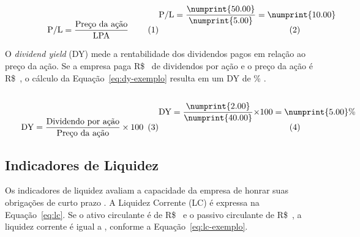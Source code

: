 \documentclass[recuosum=1.5cm]{iftex2024}
\begin{document}
\bigskip
\begin{subequations} \noindent
\begin{minipage}[b]{0.48\linewidth}
    \begin{equation} \label{eq:pl}
        \text{P/L} = \frac{\text{Preço da ação}}{\text{LPA}}
    \end{equation}
\end{minipage}
\hfill
\begin{minipage}[b]{0.48\linewidth}
    \begin{equation} \label{eq:pl-exemplo}
        \text{P/L} = \frac{\numprint{50.00}}{\numprint{5.00}} = \numprint{10.00}
    \end{equation}
\end{minipage}
\end{subequations}
\bigskip

O \textit{dividend yield} (DY) mede a rentabilidade dos dividendos pagos em relação ao preço da ação. Se a empresa paga R\$~ de dividendos por ação e o preço da ação é R\$~, o cálculo da Equação~\eqref{eq:dy-exemplo} resulta em um DY de \% \cite{kearney:2014:textual}.

\bigskip
\begin{subequations} \noindent
\begin{minipage}[b]{0.48\linewidth}
    \begin{equation} \label{eq:dy}
        \text{DY} = \frac{\text{Dividendo por ação}}{\text{Preço da ação}} \times 100
    \end{equation}
\end{minipage}
\hfill
\begin{minipage}[b]{0.48\linewidth}
    \begin{equation} \label{eq:dy-exemplo}
        \text{DY} = \frac{\numprint{2.00}}{\numprint{40.00}} \times 100 = \numprint{5.00}\%
    \end{equation}
\end{minipage}
\end{subequations}
\bigskip

\subsection{Indicadores de Liquidez}

Os indicadores de liquidez avaliam a capacidade da empresa de honrar suas obrigações de curto prazo \cite{claessens:2017:macroeconomic}. A Liquidez Corrente (LC) é expressa na Equação~\eqref{eq:lc}. Se o ativo circulante é de R\$~ e o passivo circulante de R\$~, a liquidez corrente é igual a , conforme a Equação~\eqref{eq:lc-exemplo}.
\end{document}
